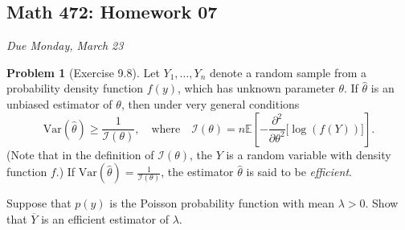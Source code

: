 \documentclass[10pt]{article}
\theoremstyle{definition}
\newtheorem{problem}[theorem]{Problem}
\newcommand{\1}[1]{\textbf{1}_{\left[#1\right]}} %
\def\E{\mathbb{E}} %
\def\Var{\mathrm{Var}} %
\begin{document}
\begin{center}
  \section*{Math 472: Homework 07}
  \textit{Due Monday, March 23}
\end{center}


\begin{problem}[Exercise 9.8]
  Let  $Y_{1},\ldots,Y_{n}$ denote a random sample from a probability density
  function $f(y)$, which has unknown parameter $\theta$. If $\widehat{\theta}$
  is an unbiased estimator of $\theta$, then under very general conditions
  \begin{equation*}
    \Var(\widehat{\theta}) \geq \frac{1}{\mathcal{I}(\theta)},
    \quad \text{where} \quad 
    \mathcal{I}(\theta)= n \E\left[- \frac{\partial^{2}}{\partial \theta^{2} }\Big[\log(f(Y)) \Big]  \right].
  \end{equation*}
  (Note that in the definition of $\mathcal{I}(\theta)$, the $Y$ is a random
  variable with density function $f$.) If
  $\Var(\widehat{\theta})=\frac{1}{\mathcal{I}(\theta)}$, the estimator
  $\widehat{\theta}$ is said to be \textit{efficient}.

  Suppose that $p(y)$ is the Poisson probability function with mean
  $\lambda>0$. Show that $\overline{Y}$ is an efficient estimator of $\lambda$. 
\end{problem}
\end{document}
